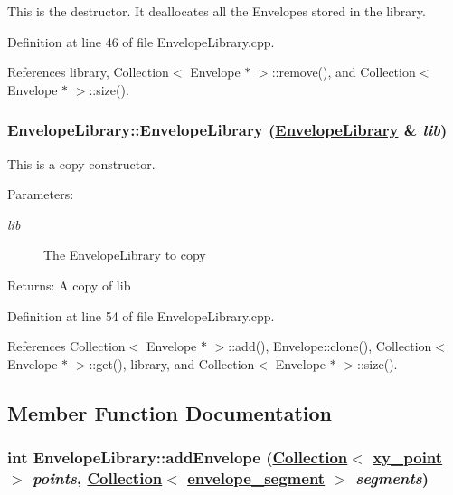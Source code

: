 This is the destructor. It deallocates all the Envelopes stored in the library. 

Definition at line 46 of file Envelope\-Library.cpp.

References library, Collection$<$ Envelope $\ast$ $>$::remove(), and Collection$<$ Envelope $\ast$ $>$::size().\hypertarget{classEnvelopeLibrary_a2}{
\subsubsection[EnvelopeLibrary]{\setlength{\rightskip}{0pt plus 5cm}Envelope\-Library::Envelope\-Library (\hyperlink{classEnvelopeLibrary}{Envelope\-Library} \& {\em lib})}}
\label{classEnvelopeLibrary_a2}


This is a copy constructor. \begin{Desc}
\item[Parameters:]
\begin{description}
\item[{\em lib}]The Envelope\-Library to copy \end{description}
\end{Desc}
\begin{Desc}
\item[Returns:]A copy of lib \end{Desc}


Definition at line 54 of file Envelope\-Library.cpp.

References Collection$<$ Envelope $\ast$ $>$::add(), Envelope::clone(), Collection$<$ Envelope $\ast$ $>$::get(), library, and Collection$<$ Envelope $\ast$ $>$::size().

\subsection{Member Function Documentation}
\hypertarget{classEnvelopeLibrary_a8}{
\subsubsection[addEnvelope]{\setlength{\rightskip}{0pt plus 5cm}int Envelope\-Library::add\-Envelope (\hyperlink{classCollection}{Collection}$<$ \hyperlink{structxy__point}{xy\_\-point} $>$ {\em points}, \hyperlink{classCollection}{Collection}$<$ \hyperlink{structenvelope__segment}{envelope\_\-segment} $>$ {\em segments})}}
\label{classEnvelopeLibrary_a8}


